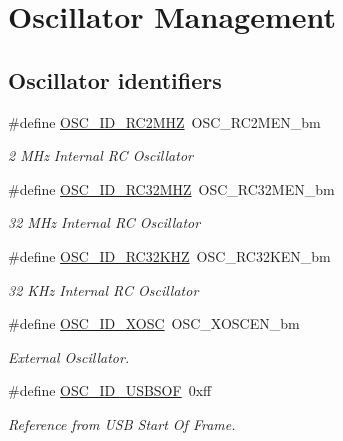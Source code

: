 \hypertarget{group__osc__group}{\section{Oscillator Management}
\label{group__osc__group}
}
\subsection*{Oscillator identifiers}
\begin{DoxyCompactItemize}
\item 
\hypertarget{group__osc__group_ga67ca00b25c039d60efda0ad79e92678f}{\#define \hyperlink{group__osc__group_ga67ca00b25c039d60efda0ad79e92678f}{O\-S\-C\-\_\-\-I\-D\-\_\-\-R\-C2\-M\-H\-Z}~O\-S\-C\-\_\-\-R\-C2\-M\-E\-N\-\_\-bm}\label{group__osc__group_ga67ca00b25c039d60efda0ad79e92678f}

\begin{DoxyCompactList}\small\item\em 2 M\-Hz Internal R\-C Oscillator \end{DoxyCompactList}\item 
\hypertarget{group__osc__group_ga238f0d5c7397dfc86f2da8f1afe75e91}{\#define \hyperlink{group__osc__group_ga238f0d5c7397dfc86f2da8f1afe75e91}{O\-S\-C\-\_\-\-I\-D\-\_\-\-R\-C32\-M\-H\-Z}~O\-S\-C\-\_\-\-R\-C32\-M\-E\-N\-\_\-bm}\label{group__osc__group_ga238f0d5c7397dfc86f2da8f1afe75e91}

\begin{DoxyCompactList}\small\item\em 32 M\-Hz Internal R\-C Oscillator \end{DoxyCompactList}\item 
\hypertarget{group__osc__group_gae3e39d76a966560eb10ae4c6d9eca429}{\#define \hyperlink{group__osc__group_gae3e39d76a966560eb10ae4c6d9eca429}{O\-S\-C\-\_\-\-I\-D\-\_\-\-R\-C32\-K\-H\-Z}~O\-S\-C\-\_\-\-R\-C32\-K\-E\-N\-\_\-bm}\label{group__osc__group_gae3e39d76a966560eb10ae4c6d9eca429}

\begin{DoxyCompactList}\small\item\em 32 K\-Hz Internal R\-C Oscillator \end{DoxyCompactList}\item 
\hypertarget{group__osc__group_ga06beba0d3cb4adcbf2f8a6f8cf5d72ff}{\#define \hyperlink{group__osc__group_ga06beba0d3cb4adcbf2f8a6f8cf5d72ff}{O\-S\-C\-\_\-\-I\-D\-\_\-\-X\-O\-S\-C}~O\-S\-C\-\_\-\-X\-O\-S\-C\-E\-N\-\_\-bm}\label{group__osc__group_ga06beba0d3cb4adcbf2f8a6f8cf5d72ff}

\begin{DoxyCompactList}\small\item\em External Oscillator. \end{DoxyCompactList}\item 
\#define \hyperlink{group__osc__group_ga31d93aece1229930bd2934a2ff26abdd}{O\-S\-C\-\_\-\-I\-D\-\_\-\-U\-S\-B\-S\-O\-F}~0xff
\begin{DoxyCompactList}\small\item\em Reference from U\-S\-B Start Of Frame. \end{DoxyCompactList}\end{DoxyCompactItemize}
